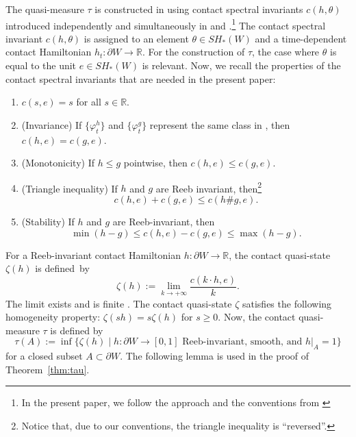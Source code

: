 \documentclass[10pt,a4paper]{amsart}
\numberwithin{equation}{section}
\theoremstyle{definition}
\begin{document}
The quasi-measure $\tau$ is constructed in \cite{djordjevic2025quantitative} using contact spectral invariants $c(h, \theta)$ introduced independently and simultaneously in \cite{cant2023shelukhin} and \cite{djordjevic2023quantitative}.\footnote{In the present paper, we follow the approach and the conventions from \cite{djordjevic2025quantitative}} The contact spectral invariant $c(h, \theta)$ is assigned to an element $\theta\in SH_\ast(W)$ and a time-dependent contact Hamiltonian $h_t\colon \partial W\to \mathbb{R}$. {For} the construction of $\tau$, the case where $\theta$ is equal to the unit $e\in SH_\ast(W)$ is relevant.
Now, we recall the properties of the contact spectral invariants that are needed in the present paper:
\begin{enumerate}\itemsep=0pt
\item[(1)] $c(s, e)= s$ for all $s\in \mathbb{R}$.
\item[(2)] ({Invariance}) If $\bigl\{\varphi^h_t\bigr\}$ and $ \{\varphi_t^g \}$ represent the same class in , then $c(h,e)= c(g, e)$.
\item[(3)] (Monotonicity) If $h\leqslant g$ pointwise, then ${c(h, e)\leqslant c(g, e)}$.
\item[(4)] (Triangle inequality) If $h$ and $g$ are Reeb invariant, then\footnote{Notice that, due to our conventions, the triangle inequality is ``reversed''.}
\[
c(h, e) + c(g, e)\leqslant c(h\#g, e).
\]
\item[(5)] (Stability) If $h$ and $g$ are Reeb-invariant, then
\[ \min (h-g)\leqslant c(h,e) - c(g, e)\leqslant \max(h-g). \]
\end{enumerate}

For a Reeb-invariant contact Hamiltonian $h\colon \partial W\to\mathbb{R}$, the contact quasi-state $\zeta(h)$ is defined~by
\[\zeta(h):= \lim_{k\to+\infty} \frac{c(k\cdot h, e)}{k}.\]
The limit exists and is finite \cite[Lemma~7.2]{djordjevic2025quantitative}. The contact quasi-state $\zeta$ satisfies the following homogeneity property: $\zeta(sh)= s \zeta(h)$ for $s\geqslant 0$. Now, the contact quasi-measure $\tau$ is defined by
\[ \tau(A):= \inf \{ \zeta(h)\mid h\colon\partial W\to[0,1] \text{ Reeb-invariant, smooth, and } h|_A=1 \} \]
for a closed subset $A\subset\partial W$. The following lemma is used in the proof of Theorem~\ref{thm:tau}.
\end{document}
